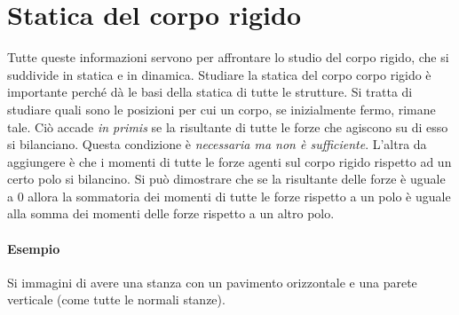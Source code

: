 \section{Statica del corpo rigido}

Tutte queste informazioni servono per affrontare lo studio del corpo rigido, che si suddivide in statica e in dinamica.
Studiare la statica del corpo corpo rigido è importante perché dà le basi della statica di tutte le strutture. Si tratta di studiare quali sono le posizioni per cui un corpo, se inizialmente fermo, rimane tale. Ciò accade \textit{in primis} se la risultante di tutte le forze che agiscono su di esso si bilanciano. Questa condizione è \emph{necessaria ma non è sufficiente}. L'altra da aggiungere è che i momenti di tutte le forze agenti sul corpo rigido rispetto ad un certo polo si bilancino. Si può dimostrare che se la risultante delle forze è uguale a $0$ allora la sommatoria dei momenti di tutte le forze rispetto a un polo è uguale alla somma dei momenti delle forze rispetto a un altro polo.

\paragraph{Esempio} Si immagini di avere una stanza con un pavimento orizzontale e una parete verticale (come tutte le normali stanze).

